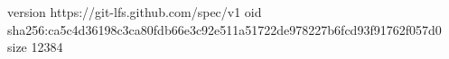 version https://git-lfs.github.com/spec/v1
oid sha256:ca5c4d36198c3ca80fdb66e3c92e511a51722de978227b6fcd93f91762f057d0
size 12384
